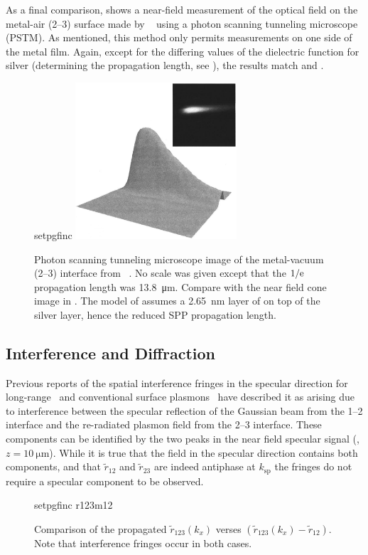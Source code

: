As a final comparison,  shows a near-field
measurement of the optical field on the metal-air (2--3) surface made by
~\cite{dawson2001surface} using a photon scanning tunneling
microscope (PSTM).  As mentioned, this method only permits measurements on one
side of the metal film.  Again, except for the differing values of the
dielectric function for silver (determining the propagation length, see
), the results match  and 
.
\begin{figure}[ht]
\centering
{setpgfinc}
\includegraphics[keepaspectratio,width=6cm]{interference/figures/DawsonTransmitted.png}
\caption{Photon scanning tunneling microscope image of the metal-vacuum (2--3)
				interface from ~\cite{dawson2001surface}.  No scale was
				given except that the $1/{\mathrm{e}}$ propagation length was
				\SI{13.8}{\micro\meter}.  Compare with
				the near field cone image in .  The model of
				 assumes a \SI{2.65}{\nano\meter} layer of  on
				top of the silver layer, hence the reduced SPP propagation length.}
\label{fig:dawsoncompare}
\end{figure}


\subsection{Interference and Diffraction}
Previous reports of the spatial interference fringes in the specular direction
for long-range~\cite{simon2007observation} and conventional surface
plasmons~\cite{schumann2008near} have described it as arising due to
interference between the specular reflection of the Gaussian beam from the
1--2 interface and the re-radiated plasmon field from the 2--3 interface.
These components can be identified by the two peaks in the near field specular
signal (, $z=\SI{10}{\micro\meter}$).  While it is
true that the field in the specular direction contains both components, and
that $\tilde{r}_{12}$ and $\tilde{r}_{23}$ are indeed antiphase at
$k_\text{sp}$ the fringes do not require a specular component to be observed.
\begin{figure}[ht]
\centering
{setpgfinc}
{r123m12}
\caption{Comparison of the propagated $\tilde{r}_{123}(k_x)$ verses
$(\tilde{r}_{123}(k_x)-\tilde{r}_{12})$.  Note that interference fringes occur in
both cases.  }
\label{fig:r123m12}
\end{figure}


